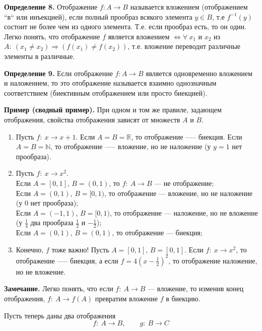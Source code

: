 \documentclass{article}
\begin{document}
    \textbf{Определение 8.} Отображение $f: A \rightarrow B$ называется вложением (отображением ``в`` или инъекцией), если полный прообраз всякого элемента $y \in B$, т.е $f^{-1}(y)$ состоит не более чем из одного элемента. Т.е. если прообраз есть, то он один. Легко понять, что отображение $f$ является вложением $\Leftrightarrow \forall\ x_1$ и $x_2$ из $A:\ (x_1 \neq x_2) \Rightarrow (f(x_1) \neq f(x_2))$, т.е. вложение переводит различные элементы в различные.

    \textbf{Определение 9.} Если отображение $f: A \rightarrow B$ является одновременно вложением и наложением, то это отображение называется взаимно однозначным соответствием (биективным отображением или просто биекцией).

    \textbf{Пример (сводный пример).} При одном и том же правиле, задающем отображения, свойства отображения зависят от множеств $A$ и $B$.

    \begin{enumerate}
        \item Пусть $f:\ x \rightarrow x + 1$. Если $A = B = \mathbb{R}$, то отображение —-- биекция. Если $A = B = \mathbb{N}$, то отображение —-- вложение, но не наложение (у $y = 1$ нет прообраза).
        \item Пусть $f:\ x \rightarrow x^2$.\\
        Если $A = [0, 1]$, $B = (0, 1)$, то $f:\ A \rightarrow B$ --- не отображение;\\
        Если $A = (0, 1)$, $B = [0, 1)$, то отображение --- вложение, но не наложение (у $0$ нет прообраза);\\
        Если $A = (-1, 1)$, $B = [0, 1)$, то отображение --- наложение, но не вложение (у $\frac{1}{4}$ два прообраза $\frac{1}{2}$ и $-\frac{1}{2}$);\\
        Если $A = (0, 1)$, $B = (0, 1)$, то отображение --- биекция;
        \item Конечно, $f$ тоже важно! Пусть $A = [0, 1]$, $B = [0, 1]$. Если $f:\ x \rightarrow x^2$, то отображение —-- биекция, а если $f = 4(x - \frac{1}{2})^2$, то отображение наложение, но не вложение.
    \end{enumerate}

    \textbf{Замечание.} Легко понять, что если $f:\ A \rightarrow B$ --- вложение, то изменив конец отображения, $f:\ A \rightarrow f(A)$ превратим вложение $f$ в биекцию.

    Пусть теперь даны два отображения
    \[f:\ A \rightarrow B,\qquad g:\ B \rightarrow C\]
\end{document}
